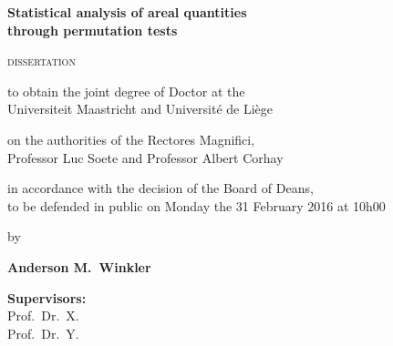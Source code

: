 \pagestyle{empty}
\vspace*{3cm}
\vspace*{\fill}
\begin{center}
\begin{Huge}
\textbf{Statistical analysis of areal quantities\\through permutation tests}
\end{Huge}
\end{center}

\vfill

\begin{center}
\textsc{dissertation}

\vfill

to obtain the joint degree of Doctor at the\\
Universiteit Maastricht and Universit\'{e} de Li\`{e}ge

\vfill

on the authorities of the Rectores Magnifici,\\
Professor Luc Soete and Professor Albert Corhay

\vfill

in accordance with the decision of the Board of Deans,\\
to be defended in public on Monday the 31 February 2016 at 10h00

\vfill

by
\end{center}

\vfill

\begin{center}
\begin{Large}
\textbf{Anderson M.\ Winkler}
\end{Large}
\end{center}

\vspace*{3cm}
\vspace*{\fill}

\newpage
{}
\noindent
\textbf{Supervisors:}\\
Prof.\ Dr.\ X.\\
Prof.\ Dr.\ Y.

